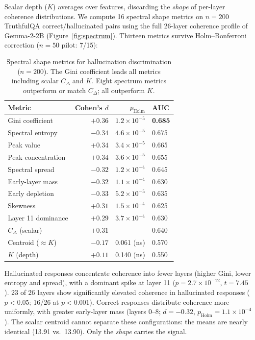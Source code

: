 \documentclass{article}
\begin{document}
Scalar depth ($K$) averages over features, discarding the
\textit{shape} of per-layer coherence distributions. We compute
16 spectral shape metrics on $n = 200$ TruthfulQA
correct/hallucinated pairs using the full 26-layer coherence
profile of Gemma-2-2B (Figure~\ref{fig:spectrum}). Thirteen metrics
survive Holm--Bonferroni correction ($n = 50$ pilot: 7/15):

\begin{table}[h]
\centering
\small
\begin{tabular}{lrrl}
\toprule
Metric & Cohen's $d$ & $p_\text{Holm}$ & AUC \\
\midrule
Gini coefficient        & $+0.36$ & $1.2 \times 10^{-5}$ & \textbf{0.685} \\
Spectral entropy        & $-0.34$ & $4.6 \times 10^{-5}$ & 0.675 \\
Peak value              & $+0.34$ & $3.4 \times 10^{-5}$ & 0.665 \\
Peak concentration      & $+0.34$ & $3.6 \times 10^{-5}$ & 0.655 \\
Spectral spread         & $-0.32$ & $1.2 \times 10^{-4}$ & 0.645 \\
Early-layer mass        & $-0.32$ & $1.1 \times 10^{-4}$ & 0.630 \\
Early depletion         & $-0.33$ & $5.2 \times 10^{-5}$ & 0.635 \\
Skewness                & $+0.31$ & $1.5 \times 10^{-4}$ & 0.625 \\
Layer 11 dominance      & $+0.29$ & $3.7 \times 10^{-4}$ & 0.630 \\
\midrule
$C_\Delta$ (scalar)     & $+0.31$ & --- & 0.640 \\
Centroid ($\approx K$)  & $-0.17$ & 0.061 (ns) & 0.570 \\
$K$ (depth)             & $+0.11$ & 0.140 (ns) & 0.550 \\
\bottomrule
\end{tabular}
\caption{Spectral shape metrics for hallucination discrimination
($n = 200$). The Gini coefficient leads all metrics including
scalar $C_\Delta$ and $K$. Eight spectrum metrics outperform or
match $C_\Delta$; all outperform $K$.}
\label{tab:spectrum}
\end{table}

Hallucinated responses concentrate coherence into fewer layers
(higher Gini, lower entropy and spread), with a dominant spike at
layer 11 ($p = 2.7 \times 10^{-12}$, $t = 7.45$). 23 of 26 layers
show significantly elevated coherence in hallucinated responses
($p < 0.05$; 16/26 at $p < 0.001$).
Correct responses distribute coherence more uniformly, with
greater early-layer mass (layers 0--8; $d = -0.32$,
$p_\text{Holm} = 1.1 \times 10^{-4}$). The scalar centroid
cannot separate these configurations: the means are nearly
identical (13.91 vs.\ 13.90). Only the \textit{shape} carries
the signal.
\end{document}
